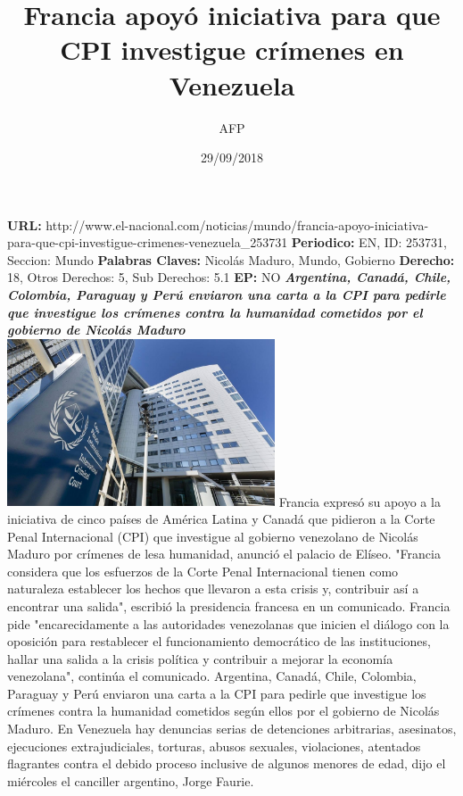 \documentclass{article}%
\title{\textbf{Francia apoyó iniciativa para que CPI investigue crímenes en Venezuela}}%
\author{AFP}%
\date{29/09/2018}%
\begin{document}
%
\normalsize%
\maketitle%
\textbf{URL: }%
http://www.el{-}nacional.com/noticias/mundo/francia{-}apoyo{-}iniciativa{-}para{-}que{-}cpi{-}investigue{-}crimenes{-}venezuela\_253731\newline%
%
\textbf{Periodico: }%
EN, %
ID: %
253731, %
Seccion: %
Mundo\newline%
%
\textbf{Palabras Claves: }%
Nicolás Maduro, Mundo, Gobierno\newline%
%
\textbf{Derecho: }%
18, %
Otros Derechos: %
5, %
Sub Derechos: %
5.1\newline%
%
\textbf{EP: }%
NO\newline%
\newline%
%
\textbf{\textit{Argentina, Canadá, Chile, Colombia, Paraguay y Perú enviaron una carta a la CPI para pedirle que investigue los crímenes contra la humanidad cometidos por el gobierno de Nicolás Maduro}}%
\newline%
\newline%
%
\includegraphics[width=300px]{212.jpg}%
\newline%
%
Francia expresó su apoyo a la iniciativa de cinco países de América Latina y Canadá que pidieron a la Corte Penal Internacional (CPI) que investigue al gobierno venezolano de Nicolás Maduro por crímenes de lesa humanidad, anunció el palacio de Elíseo.%
\newline%
%
"Francia considera que los esfuerzos de la Corte Penal Internacional tienen como naturaleza establecer los hechos que llevaron a esta crisis y, contribuir así a encontrar una salida", escribió la presidencia francesa en un comunicado.%
\newline%
%
Francia pide "encarecidamente a las autoridades venezolanas que inicien el diálogo con la oposición para restablecer el funcionamiento democrático de las instituciones, hallar una salida a la crisis política y contribuir a mejorar la economía venezolana", continúa el comunicado.%
\newline%
%
Argentina, Canadá, Chile, Colombia, Paraguay y Perú enviaron una carta a la CPI para pedirle que investigue los crímenes contra la humanidad cometidos según ellos por el gobierno de Nicolás Maduro.%
\newline%
%
En Venezuela hay denuncias serias de detenciones arbitrarias, asesinatos, ejecuciones extrajudiciales, torturas, abusos sexuales, violaciones, atentados flagrantes contra el debido proceso inclusive de algunos menores de edad, dijo el miércoles el canciller argentino, Jorge Faurie.%
\newline%
%
\end{document}
